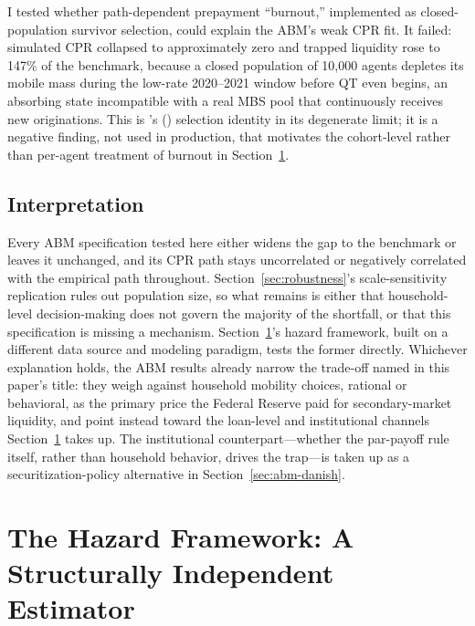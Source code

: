 \documentclass[12pt]{article}
\newcommand{\citepos}[1]{\citeauthor{#1}'s (\citeyear{#1})}
\begin{document}
I tested whether path-dependent prepayment ``burnout,'' implemented as closed-population survivor selection, could explain the ABM's weak CPR fit. It failed: simulated CPR collapsed to approximately zero and trapped liquidity rose to 147\% of the benchmark, because a closed population of 10,000 agents depletes its mobile mass during the low-rate 2020--2021 window before QT even begins, an absorbing state incompatible with a real MBS pool that continuously receives new originations. This is \citepos{lesniewski2026} selection identity in its degenerate limit; it is a negative finding, not used in production, that motivates the cohort-level rather than per-agent treatment of burnout in Section~\ref{sec:hazard}.

\subsection{Interpretation}\label{sec:abm-interp}

Every ABM specification tested here either widens the gap to the benchmark or leaves it unchanged, and its CPR path stays uncorrelated or negatively correlated with the empirical path throughout. Section~\ref{sec:robustness}'s scale-sensitivity replication rules out population size, so what remains is either that household-level decision-making does not govern the majority of the shortfall, or that this specification is missing a mechanism. Section~\ref{sec:hazard}'s hazard framework, built on a different data source and modeling paradigm, tests the former directly. Whichever explanation holds, the ABM results already narrow the trade-off named in this paper's title: they weigh against household mobility choices, rational or behavioral, as the primary price the Federal Reserve paid for secondary-market liquidity, and point instead toward the loan-level and institutional channels Section~\ref{sec:hazard} takes up. The institutional counterpart---whether the par-payoff rule itself, rather than household behavior, drives the trap---is taken up as a securitization-policy alternative in Section~\ref{sec:abm-danish}.

\section{The Hazard Framework: A Structurally Independent Estimator}\label{sec:hazard}
\end{document}
